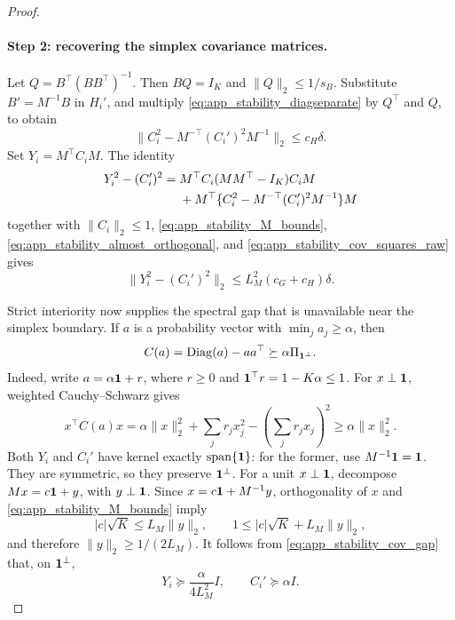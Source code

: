 \begin{proof}
\paragraph{Step 2: recovering the simplex covariance matrices.}
Let
\(Q=B^\top(BB^\top)^{-1}\).  Then \(BQ=I_K\) and
\(\|Q\|_2\le1/s_B\).  Substitute \(B'=M^{-1}B\) in \(H_i'\), and multiply
\eqref{eq:app_stability_diagseparate} by \(Q^\top\) and \(Q\), to obtain
\begin{equation}
 \|C_i^2-M^{-\top}(C_i')^2M^{-1}\|_2\le c_H\delta.
 \label{eq:app_stability_cov_squares_raw}
\end{equation}
Set \(Y_i=M^\top C_iM\).  The identity
\begin{align}
 Y_i^2-(C_i')^2
 ={}&M^\top C_i(MM^\top-I_K)C_iM \notag\\
 &+M^\top\{C_i^2-M^{-\top}(C_i')^2M^{-1}\}M
 \label{eq:app_stability_cov_squares}
\end{align}
together with \(\|C_i\|_2\le1\),
\eqref{eq:app_stability_M_bounds},
\eqref{eq:app_stability_almost_orthogonal}, and
\eqref{eq:app_stability_cov_squares_raw} gives
\begin{equation}
 \|Y_i^2-(C_i')^2\|_2
 \le L_M^2(c_G+c_H)\delta.
 \label{eq:app_stability_square_bound}
\end{equation}

Strict interiority now supplies the spectral gap that is unavailable near the
simplex boundary.  If \(a\) is a probability vector with
\(\min_j a_j\ge\alpha\), then
\begin{equation}
 C(a)=\operatorname{Diag}(a)-aa^\top
 \succeq\alpha\Pi_{\mathbf{1}^\perp}.
 \label{eq:app_stability_cov_gap}
\end{equation}
Indeed, write \(a=\alpha\mathbf{1}+r\), where \(r\ge0\) and
\(\mathbf{1}^\top r=1-K\alpha\le1\).  For \(x\perp\mathbf{1}\), weighted
Cauchy--Schwarz gives
\[
 x^\top C(a)x
 =\alpha\|x\|_2^2+\sum_jr_jx_j^2-\left(\sum_jr_jx_j\right)^2
 \ge\alpha\|x\|_2^2.
\]
Both \(Y_i\) and \(C_i'\) have kernel exactly
\(\operatorname{span}\{\mathbf{1}\}\): for the former, use
\(M^{-1}\mathbf{1}=\mathbf{1}\).  They are symmetric, so they preserve
\(\mathbf{1}^\perp\).  For a unit \(x\perp\mathbf{1}\), decompose
\(Mx=c\mathbf{1}+y\), with \(y\perp\mathbf{1}\).  Since
\(x=c\mathbf{1}+M^{-1}y\), orthogonality of \(x\) and
\eqref{eq:app_stability_M_bounds} imply
\begin{equation}
 |c|\sqrt K\le L_M\|y\|_2,\qquad
 1\le |c|\sqrt K+L_M\|y\|_2,
\end{equation}
and therefore \(\|y\|_2\ge1/(2L_M)\).  It follows from
\eqref{eq:app_stability_cov_gap} that, on \(\mathbf{1}^\perp\),
\begin{equation}
 Y_i\succeq\frac{\alpha}{4L_M^2}I,
 \qquad C_i'\succeq\alpha I.
 \label{eq:app_stability_two_gaps}
\end{equation}


\end{proof}
